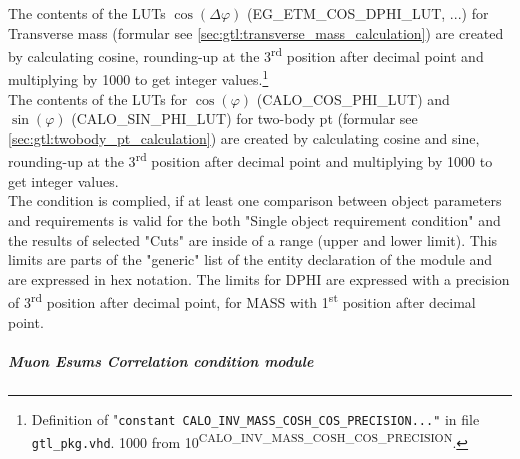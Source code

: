 The contents of the LUTs $\cos(\Delta\varphi)$ (\small{EG\_ETM\_COS\_DPHI\_LUT}\normalsize, ...) for Transverse mass (formular see \ref{sec:gtl:transverse_mass_calculation}) 
are created by calculating cosine, rounding-up at the 3\textsuperscript{rd}
position after decimal point and multiplying by 1000 to get integer values.\footnote{Definition of "\texttt{constant \small{CALO\_INV\_MASS\_COSH\_COS\_PRECISION}\normalsize ..."} in file \texttt{gtl\_pkg.vhd}.
1000 from 10\textsuperscript{\tiny{CALO\_INV\_MASS\_COSH\_COS\_PRECISION}}\normalsize.}\\
The contents of the LUTs for $\cos(\varphi)$ (\small{CALO\_COS\_PHI\_LUT}\normalsize) and $\sin(\varphi)$ (\small{CALO\_SIN\_PHI\_LUT}\normalsize) for two-body pt 
(formular see \ref{sec:gtl:twobody_pt_calculation}) are created by calculating cosine and sine, rounding-up at the 3\textsuperscript{rd} position after decimal point and multiplying by 1000 to get integer values.\\
The condition is complied, if at least one comparison between object parameters and requirements is valid for the both "Single object requirement condition"
and the results of selected "Cuts" are inside of a range (upper and lower limit).
This limits are parts of the "generic" list of the entity declaration of the module and are expressed in hex notation. The limits for DPHI
are expressed with a precision of 3\textsuperscript{rd} position after decimal point, for MASS with 1\textsuperscript{st} position after decimal point.

\subparagraph{Muon Esums Correlation condition module}
\label{sec:gtl:muon_esums_correlation_condition_module}

